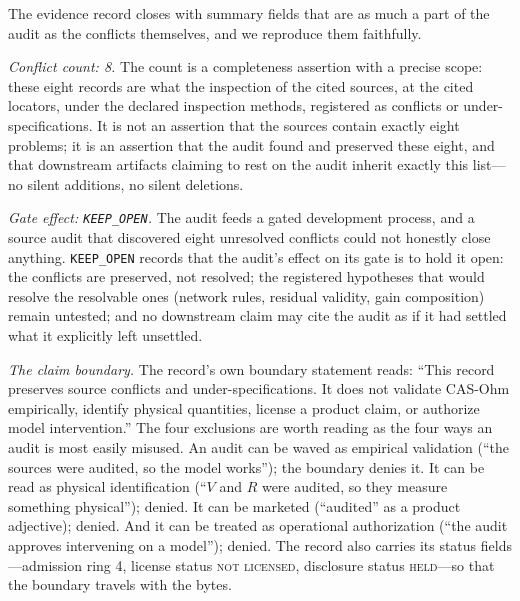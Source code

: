 The evidence record closes with summary fields that are as much a part of the
audit as the conflicts themselves, and we reproduce them faithfully.

\emph{Conflict count: 8.} The count is a completeness assertion with a
precise scope: these eight records are what the inspection of the cited
sources, at the cited locators, under the declared inspection methods,
registered as conflicts or under-specifications. It is not an assertion that
the sources contain exactly eight problems; it is an assertion that the audit
found and preserved these eight, and that downstream artifacts claiming to
rest on the audit inherit exactly this list---no silent additions, no silent
deletions.

\emph{Gate effect: \texttt{KEEP\_OPEN}.} The audit feeds a gated development
process, and a source audit that discovered eight unresolved conflicts could
not honestly close anything. \texttt{KEEP\_OPEN} records that the audit's
effect on its gate is to hold it open: the conflicts are preserved, not
resolved; the registered hypotheses that would resolve the resolvable ones
(network rules, residual validity, gain composition) remain untested; and no
downstream claim may cite the audit as if it had settled what it explicitly
left unsettled.

\emph{The claim boundary.} The record's own boundary statement reads: ``This
record preserves source conflicts and under-specifications. It does not
validate CAS-Ohm empirically, identify physical quantities, license a
product claim, or authorize model intervention.'' The four exclusions are
worth reading as the four ways an audit is most easily misused. An audit can
be waved as empirical validation (``the sources were audited, so the model
works''); the boundary denies it. It can be read as physical identification
(``$V$ and $R$ were audited, so they measure something physical''); denied.
It can be marketed (``audited'' as a product adjective); denied. And it can
be treated as operational authorization (``the audit approves intervening on
a model''); denied. The record also carries its status fields---admission
ring 4, license status \textsc{not licensed}, disclosure status
\textsc{held}---so that the boundary travels with the bytes.

